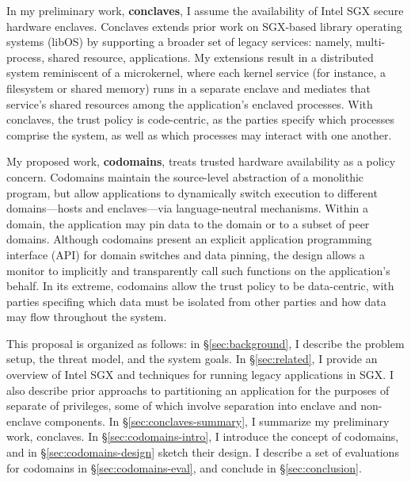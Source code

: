 %
In my preliminary work, \textbf{conclaves}, I assume the availability of Intel
SGX secure hardware enclaves.
%
Conclaves extends prior work on SGX-based library operating systems (libOS) by
supporting a broader set of legacy services: namely, multi-process, shared
resource, applications.
%
My extensions result in a distributed system reminiscent of a microkernel,
where each kernel service (for instance, a filesystem or shared memory)
runs in a separate enclave and mediates that service's shared resources
among the application's enclaved processes.
%
With conclaves, the trust policy is code-centric, as the parties specify which
processes comprise the system, as well as which processes may interact with one
another.


My proposed work, \textbf{codomains}, treats trusted hardware availability as a
policy concern.
%
Codomains maintain the source-level abstraction of a monolithic program, but
allow applications to dynamically switch execution to different domains---hosts
and enclaves---via language-neutral mechanisms.
%
Within a domain, the application may pin data to the domain or to a subset of
peer domains.
%
Although codomains present an explicit application programming interface (API)
for domain switches and data pinning, the design allows a monitor to implicitly
and transparently call such functions on the application's behalf.
%
In its extreme, codomains allow the trust policy to be data-centric, with parties
specifing which data must be isolated from other parties and how data may flow
throughout the system.


This proposal is organized as follows: in \S\ref{sec:background}, I describe
the problem setup, the threat model, and the system goals.
%
In \S\ref{sec:related}, I provide an overview of Intel SGX  and techniques for
running legacy applications in SGX\@.
%
I also describe prior approachs to partitioning an application for the
purposes of separate of privileges, some of which involve separation
into enclave and non-enclave components.
%
In \S\ref{sec:conclaves-summary}, I summarize my preliminary work, conclaves.
%
In \S\ref{sec:codomains-intro}, I introduce the concept of codomains, and in
\S\ref{sec:codomains-design} sketch their design.
%
I describe a set of evaluations for codomains in \S\ref{sec:codomains-eval},
and conclude in \S\ref{sec:conclusion}.

